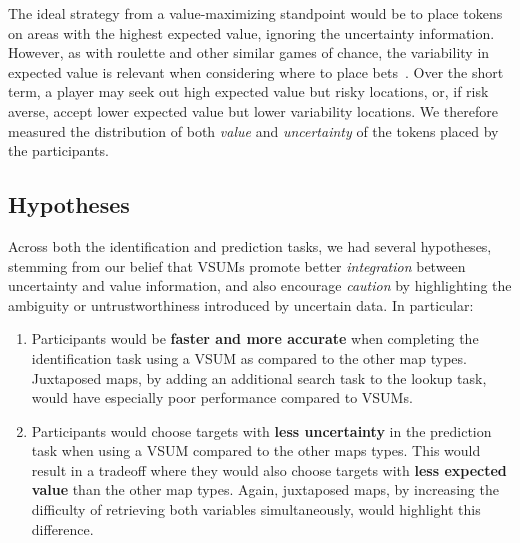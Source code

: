 \documentclass{vgtc}                          %
\begin{document}
The ideal strategy from a value-maximizing standpoint would be to place tokens on areas with the highest expected value, ignoring the uncertainty information. However, as with roulette and other similar games of chance, the variability in expected value is relevant when considering where to place bets~\cite{mlodinow2009drunkard}. Over the short term, a player may seek out high expected value but risky locations, or, if risk averse, accept lower expected value but lower variability locations. We therefore measured the distribution of both \emph{value} and \emph{uncertainty} of the tokens placed by the participants.




\subsection{Hypotheses}

Across both the identification and prediction tasks, we had several hypotheses, stemming from our belief that VSUMs promote better \emph{integration} between uncertainty and value information, and also encourage \emph{caution} by highlighting the ambiguity or untrustworthiness introduced by uncertain data. In particular:
\begin{enumerate}
	\item Participants would be \textbf{faster and more accurate} when completing the identification task using a VSUM as compared to the other map types. Juxtaposed maps, by adding an additional search task to the lookup task, would have especially poor performance compared to VSUMs.
	\item Participants would choose targets with \textbf{less uncertainty} in the prediction task when using a VSUM compared to the other maps types. This would result in a tradeoff where they would also choose targets with \textbf{less expected value} than the other map types. Again, juxtaposed maps, by increasing the difficulty of retrieving both variables simultaneously, would highlight this difference.
\end{enumerate}
\end{document}
